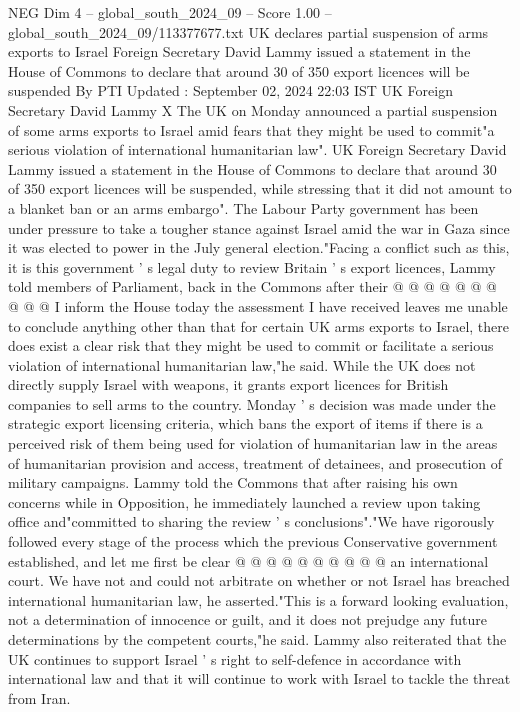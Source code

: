 \begin{textsample}{NEG Dim 4 – global\_south\_2024\_09 – Score 1.00 – global\_south\_2024\_09/113377677.txt}  \label{ex:f4_neg_188}
UK declares partial suspension of arms exports to Israel Foreign Secretary David Lammy issued a statement in the House of Commons to declare that around 30 of 350 export licences will be suspended By PTI Updated : September 02, 2024 22:03 IST UK Foreign Secretary David Lammy X The UK on Monday announced a partial suspension of some arms exports to Israel amid fears that they might be used to commit"a serious violation of international humanitarian law".
UK Foreign Secretary David Lammy issued a statement in the House of Commons to declare that around 30 of 350 export licences will be suspended, while stressing that it did not amount to a blanket ban or an arms embargo".
The Labour Party government has been under pressure to take a tougher stance against Israel amid the war in Gaza since it was elected to power in the July general election."Facing a conflict such as this, it is this government ' s legal duty to review Britain ' s export licences, Lammy told members of Parliament, back in the Commons after their @ @ @ @ @ @ @ @ @ @ I inform the House today the assessment I have received leaves me unable to conclude anything other than that for certain UK arms exports to Israel, there does exist a clear risk that they might be used to commit or facilitate a serious violation of international humanitarian law,"he said.
While the UK does not directly supply Israel with weapons, it grants export licences for British companies to sell arms to the country.
Monday ' s decision was made under the strategic export licensing criteria, which bans the export of items if there is a perceived risk of them being used for violation of humanitarian law in the areas of humanitarian provision and access, treatment of detainees, and prosecution of military campaigns.
Lammy told the Commons that after raising his own concerns while in Opposition, he immediately launched a review upon taking office and"committed to sharing the review ' s conclusions"."We have rigorously followed every stage of the process which the previous Conservative government established, and let me first be clear @ @ @ @ @ @ @ @ @ @ an international court.
We have not and could not arbitrate on whether or not Israel has breached international humanitarian law, he asserted."This is a forward looking evaluation, not a determination of innocence or guilt, and it does not prejudge any future determinations by the competent courts,"he said.
Lammy also reiterated that the UK continues to support Israel ' s right to self-defence in accordance with international law and that it will continue to work with Israel to tackle the threat from Iran.

\end{textsample}
